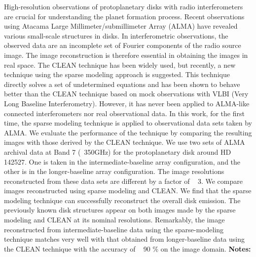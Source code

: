\documentclass{report}
\begin{document}
{{{{{{{{{{{{{{{{{{{{{{{{{{{{{{{{{{{{{{{{{{{{{{{{{{{{{{{{{{{{{{{{{{{{{{{{{{{{{{{{{{{{{{{{{{{{{{{{{{{{{{{{{{{{{{{{{{{{{{{{{{{{{{{{{{{{{{{{{{{{{{{{{{{{{{{{{{{{{{{{{{{{{{{{{{{{{{{{{{{{{{{{{{{{{{{{{High-resolution observations of protoplanetary disks with radio interferometers are crucial for understanding the planet formation process. Recent observations using Atacama Large Millimeter/submillimeter Array (ALMA) have revealed various small-scale structures in disks. In interferometric observations, the observed data are an incomplete set of Fourier components of the radio source image. The image reconstruction is therefore essential in obtaining the images in real space. The CLEAN technique has been widely used, but recently, a new technique using the sparse modeling approach is suggested. This technique directly solves a set of undetermined equations and has been shown to behave better than the CLEAN technique based on mock observations with VLBI (Very Long Baseline Interferometry). However, it has never been applied to ALMA-like connected interferometers nor real observational data. In this work, for the first time, the sparse modeling technique is applied to observational data sets taken by ALMA. We evaluate the performance of the technique by comparing the resulting images with those derived by the CLEAN technique. We use two sets of ALMA archival data at Band 7 (~350GHz) for the protoplanetary disk around HD 142527. One is taken in the intermediate-baseline array configuration, and the other is in the longer-baseline array configuration. The image resolutions reconstructed from these data sets are different by a factor of ~ 3. We compare images reconstructed using sparse modeling and CLEAN. We find that the sparse modeling technique can successfully reconstruct the overall disk emission. The previously known disk structures appear on both images made by the sparse modeling and CLEAN at its nominal resolutions. Remarkably, the image reconstructed from intermediate-baseline data using the sparse-modeling technique matches very well with that obtained from longer-baseline data using the CLEAN technique with the accuracy of ~ 90 \% on the image domain.\newline
{\bf Notes:}\newline
{\newpage
}}}}}}}}}}}}}}}}}}}}}}}}}}}}}}}}}}}}}}}}}}}}}}}}}}}}}}}}}}}}}}}}}}}}}}}}}}}}}}}}}}}}}}}}}}}}}}}}}}}}}}}}}}}}}}}}}}}}}}}}}}}}}}}}}}}}}}}}}}}}}}}}}}}}}}}}}}}}}}}}}}}}}}}}}}}}}}}}}}}}}}}}}}}}}}}}}}
\end{document}
